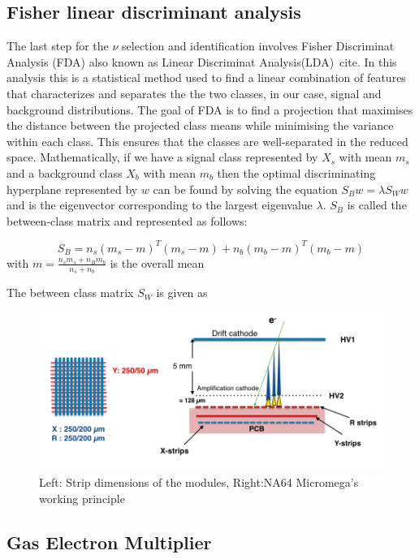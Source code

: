 \subsection{Fisher linear discriminant analysis}
\label{subsec:nu_sel_fisher}
The last step for the $\nu$ selection and identification involves Fisher Discriminat Analysis (FDA) also known as Linear Discriminat Analysis(LDA)~cite{}. In this analysis this is a statistical method used to find a linear combination of features that characterizes and separates the the two classes, in our case,  signal and background distributions. The goal of FDA is to find a projection that maximises the distance between the projected class means while minimising the variance within each class. This ensures that the classes are well-separated in the reduced space. Mathematically, if we have a signal class represented by $X_s$ with mean $m_s$ and a background class $X_b$ with mean $m_b$ then the optimal discriminating hyperplane represented by $w$ can be found by solving the equation $S_B w = \lambda S_W w$ and is the eigenvector corresponding to the largest eigenvalue $\lambda$. $S_B$ is called the between-class matrix and represented as follows:

\begin{equation}
  S_B = n_s (m_s - m)^T (m_s - m) + n_b (m_b - m)^T (m_b - m)
\end{equation}
with $m = \frac{n_s m_s + n_B m_b}{n_s + n_b}$ is the overall mean 

The between class matrix $S_W$ is given as  

\begin{figure}[t!]
\centering
\includegraphics[width=\textwidth]{thesis_figures/NA64_MM.png}
\caption{Left: Strip dimensions of the modules, Right:NA64 Micromega's working principle~\cite{Banerjee:2017mdu}}
\label{fig:Micromegas_na64}
\end{figure}

\subsection{Gas Electron Multiplier}
\label{sec:GEM}

